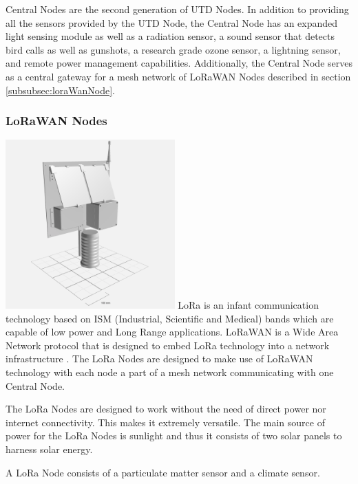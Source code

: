 \documentclass[12pt]{article}
\begin{document}
    Central Nodes are the second generation of UTD Nodes. In addition to providing all the sensors provided by the UTD Node, the Central Node has an expanded light sensing module as well as a radiation sensor, a sound sensor that detects bird calls as well as gunshots, a research grade ozone sensor, a lightning sensor, and remote power management capabilities. Additionally, the Central Node serves as a central gateway for a mesh network of LoRaWAN Nodes described in section \ref{subsubsec:loraWanNode}. 
    
 \subsubsection*{LoRaWAN Nodes}
 \label{subsubsec:loraWanNode}
    \includegraphics[width=6.5cm]
    {figures/loRaNodeV2Cropped.png}\label{fig:loranNode}
 \hfill \break
    LoRa is an infant communication technology based on ISM (Industrial, Scientific and Medical) bands which are capable of low power and Long Range applications. LoRaWAN is a Wide Area Network protocol that is designed to embed LoRa technology into a network infrastructure . The LoRa Nodes are designed to make use of LoRaWAN technology with each node a part of a mesh network communicating with one Central Node.

    The LoRa Nodes are designed to work without the need of direct power nor internet connectivity. This makes it extremely versatile. The main source of power for the LoRa Nodes is sunlight and thus it consists of two solar panels to harness solar energy.

    A LoRa Node consists of a particulate matter sensor and a climate sensor. 
     
\clearpage
\end{document}
